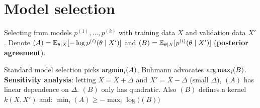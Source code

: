 \section{Model selection}
Selecting from models $p^{(1)}, \ldots, p^{(k)}$
with training data $X$ and validation data $X'$.
Denote
$(A) = \mathbb E_{\theta \mid X} [
    -\log p^{(i)} (\theta \mid X')
]$
and
$(B) = \mathbb E_{\theta \mid X} [p^{(i)}(\theta \mid X')]$
(\textbf{posterior agreement}).

Standard model selection picks $\mathop{\mathrm{argmin}}_{i} (A)$,
Buhmann advocates $\operatorname*{arg\,max}_{i} (B)$.
\textbf{Sensitivity analysis}: letting $X = \bar{X} + \Delta$
and $X' = \bar{X} - \Delta$ (small $\Delta$),
$(A)$ has linear dependence on $\Delta$.
$(B)$ only has quadratic.
Also $(B)$ defines a kernel $k(X, X')$ and: $\min_i (A) \geq -\max_i \log \big( (B) \big)$